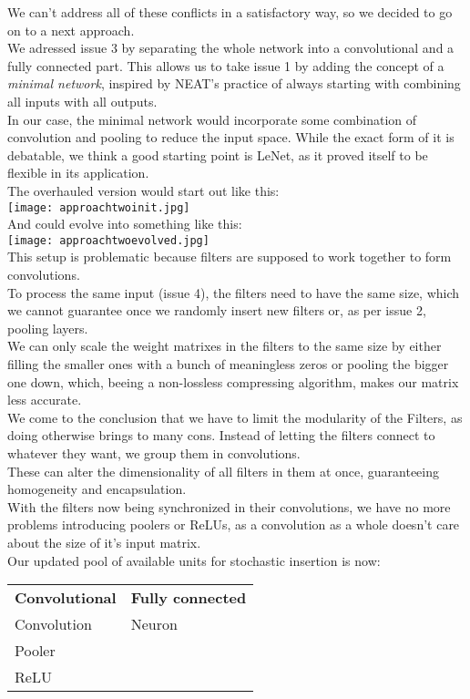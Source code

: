 We can't address all of these conflicts in a satisfactory way, so we decided to go on to a next approach.\\
We adressed issue 3 by separating the whole network into a convolutional and a fully connected part. This allows us to take issue 1 by adding the concept of a \emph{minimal network}, inspired by NEAT’s practice of always starting with combining all inputs with all outputs.\\
In our case, the minimal network would incorporate some combination of convolution and pooling to reduce the input space. While the exact form of it is debatable, we think a good starting point is LeNet, as it proved itself to be flexible in its application. \cite{YannLeCun1998}\\
The overhauled version would start out like this:\\
\texttt{[image: approachtwoinit.jpg]}\\
And could evolve into something like this:\\
\texttt{[image: approachtwoevolved.jpg]}\\
This setup is problematic because filters are supposed to work together to form convolutions.\\
To process the same input (issue 4), the filters need to have the same size, which we cannot guarantee once we randomly insert new filters or, as per issue 2, pooling layers.\\
We can only scale the weight matrixes in the filters to the same size by either filling the smaller ones with a bunch of meaningless zeros or pooling the bigger one down, which, beeing a non-lossless compressing algorithm, makes our matrix less accurate.\\
We come to the conclusion that we have to limit the modularity of the Filters, as doing otherwise brings to many cons.  
Instead of letting the filters connect to whatever they want, we group them in convolutions.\\
These can alter the dimensionality of all filters in them at once, guaranteeing homogeneity and encapsulation.\\
With the filters now being synchronized in their convolutions, we have no more problems introducing poolers or ReLUs, as a convolution as a whole doesn’t care about the size of it’s input matrix.\\
Our updated pool of available units for stochastic insertion is now:  

\begin{table}[h]
	\begin{tabular}{ll}
		\textbf{Convolutional} & \textbf{Fully connected} \\
		Convolution            & Neuron                   \\
		Pooler                 &                          \\
		ReLU                   &                         
	\end{tabular}
\end{table}

